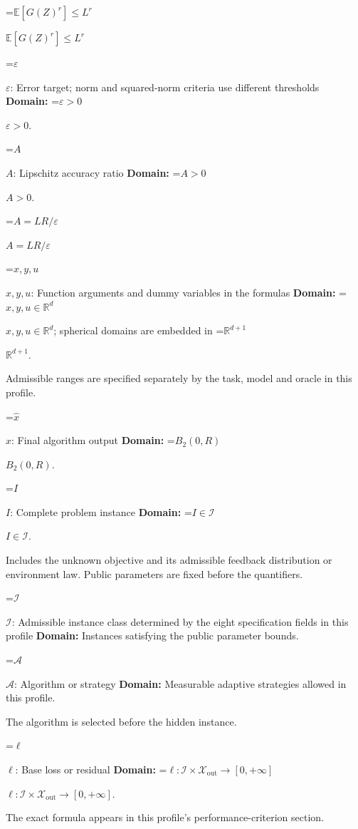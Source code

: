 \documentclass[10pt,a4paper]{article}
\newcommand{\AtlasMath}[1]{\par\begingroup\centering\setbox0=\hbox{$\displaystyle #1$}\ifdim\wd0>1.4\linewidth\typeout{ATLAS WIDE FORMULA: \the\wd0}\fi\ifdim\wd0>\linewidth\resizebox{\linewidth}{!}{\box0}\else\box0\fi\par\endgroup}
\newcommand{\AtlasInlineMath}[1]{\begingroup\setbox0=\hbox{$#1$}\ifdim\wd0>.4\linewidth\endgroup\AtlasMath{#1}\else\endgroup$#1$\fi}
\begin{document}
\AtlasInlineMath{\mathbb{E}[G(Z)^r]\le L^r}



\AtlasInlineMath{\varepsilon}: Error target; norm and squared-norm criteria use different thresholds \textbf{Domain:} \AtlasInlineMath{\varepsilon>0}.



\AtlasInlineMath{A}: Lipschitz accuracy ratio \textbf{Domain:} \AtlasInlineMath{A>0}.



\AtlasInlineMath{A=LR/\varepsilon}



\AtlasInlineMath{x,y,u}: Function arguments and dummy variables in the formulas \textbf{Domain:} \AtlasInlineMath{x,y,u\in\mathbb{R}^d}; spherical domains are embedded in \AtlasInlineMath{\mathbb{R}^{d+1}}.



Admissible ranges are specified separately by the task, model and oracle in this profile.



\AtlasInlineMath{\widehat{x}}: Final algorithm output \textbf{Domain:} \AtlasInlineMath{B_2(0,R)}.



\AtlasInlineMath{I}: Complete problem instance \textbf{Domain:} \AtlasInlineMath{I\in\mathcal{I}}.



Includes the unknown objective and its admissible feedback distribution or environment law. Public parameters are fixed before the quantifiers.



\AtlasInlineMath{\mathcal{I}}: Admissible instance class determined by the eight specification fields in this profile \textbf{Domain:} Instances satisfying the public parameter bounds.



\AtlasInlineMath{\mathcal{A}}: Algorithm or strategy \textbf{Domain:} Measurable adaptive strategies allowed in this profile.



The algorithm is selected before the hidden instance.



\AtlasInlineMath{\ell}: Base loss or residual \textbf{Domain:} \AtlasInlineMath{\ell:\mathcal{I}\times\mathcal{X}_{\mathrm{out}}\to[0,+\infty]}.



The exact formula appears in this profile's performance-criterion section.
\end{document}
